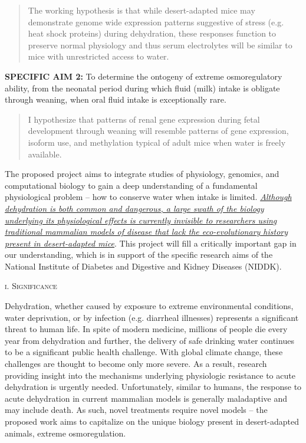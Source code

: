 \documentclass[11pt]{article}
\begin{document}
\begin{quote}
The working hypothesis is that while desert-adapted mice may demonstrate genome wide expression patterns suggestive of stress (e.g. heat shock proteins) during dehydration, these responses function to preserve normal physiology and thus serum electrolytes will be similar to mice with unrestricted access to water. 

\end{quote}

\noindent \textbf{SPECIFIC AIM 2:} To determine the ontogeny of extreme osmoregulatory ability, from the neonatal period during which fluid (milk) intake is obligate through weaning, when oral fluid intake is exceptionally rare.  

\begin{quote}
I hypothesize that patterns of renal gene expression during fetal development through weaning will resemble patterns of gene expression, isoform use, and methylation typical of adult mice when water is freely available. 

\end{quote}

The proposed project aims to integrate studies of physiology, genomics, and computational biology to gain a deep understanding of a fundamental physiological problem – how to conserve water when intake is limited. \ul{\emph{Although dehydration is both common and dangerous, a large swath of the biology underlying its physiological effects is currently invisible to researchers using traditional mammalian models of disease that lack the eco-evolutionary history present in desert-adapted mice}}.  This project will fill a critically important gap in our understanding, which is in support of the specific research aims of the National Institute of Diabetes and Digestive and Kidney Diseases (NIDDK).

\newpage
{}
\pagestyle{fancy}
\setcounter{page}{2}
\normalsize 
\begin{center}
\textsc{{i. Significance}} \\
\end{center}

Dehydration, whether caused by exposure to extreme environmental conditions, water deprivation, or by infection (e.g. diarrheal illnesses) represents a significant threat to human life. In spite of modern medicine, millions of people die every year from dehydration and further, the delivery of safe drinking water continues to be a significant public health challenge. With global climate change, these challenges are thought to become only more severe. As a result, research providing insight into the mechanisms underlying physiologic resistance to acute dehydration is urgently needed. Unfortunately, similar to humans, the response to acute dehydration in current mammalian models is generally maladaptive and may include death. As such, novel treatments require novel models -- the proposed work aims to capitalize on the unique biology present in desert-adapted animals, extreme osmoregulation. \\
\end{document}
